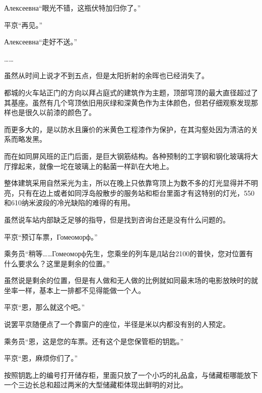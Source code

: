 \documentclass{article}
\begin{document}
Алексеевна“眼光不错，这瓶伏特加归你了。”

平京“再见。”

Алексеевна“走好不送。”

……

虽然从时间上说才不到五点，但是太阳折射的余晖也已经消失了。

都城的火车站正门的方向以拜占庭式的建筑作为主题，顶部穹顶的最大直径超过了其基座。虽然有几个穹顶依旧用灰绿和深黄色作为主体颜色，但若仔细观察发现那样也是很久以前漆的颜色了。

而更多大的，是以防水且廉价的米黄色工程漆作为保护，在其沟壑处因为清洁的关系而略发黑。

而在如同屏风班的正门后面，是巨大钢筋结构。各种预制的工字钢和钢化玻璃将大厅撑起来，就像一坨在玻璃上的黏菌一样趴在大地上。

整体建筑采用自然采光为主，所以在晚上只依靠穹顶上为数不多的灯光显得并不明亮，只有在边上或者如同浮岛般散步的服务站和柜台里面才有这特别的灯光，550和610纳米波段的冷光缺陷的难得的有用。

虽然说车站内部缺乏足够的指导，但是找到咨询台还是没有什么问题的。

平京“预订车票，Гомеоморф。”

乘务员“稍等……Гомеоморф先生，您乘坐的列车是Д站台2100的普快，您对位置有什么要求么？这里是剩余的位置。”

虽然说是剩余的位置，但是有人做和无人做的比例就如同最末场的电影放映时的就坐率一样，基本上一排都不见得能做一个人。

平京“恩，那么就这个吧。”








说罢平京随便点了一个靠窗户的座位，半径是米以内都没有别的人预定。

乘务员“恩，这是您的车票。还有这个是您保管柜的钥匙。”

平京“恩，麻烦你们了。”

按照钥匙上的编号打开储存柜，里面只放了一个小巧的礼品盒，与储藏柜哪能放下一个三边长总和超过两米的大型储藏柜体现出鲜明的对比。
\end{document}
